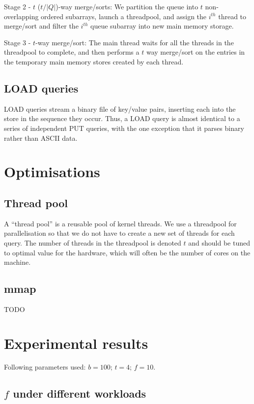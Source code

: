\documentclass{acm}
\begin{document}
Stage 2 - $t$ ($t/|Q|$)-way merge/sorts: We partition the queue into $t$ non-overlapping ordered subarrays, launch a threadpool, and assign the $i^{th}$ thread to merge/sort and filter the $i^{th}$ queue subarray into new main memory storage.

Stage 3 - $t$-way merge/sort: The main thread waits for all the threads in the threadpool to complete, and then performs a $t$ way merge/sort on the entries in the temporary main memory stores created by each thread.

\subsection{LOAD queries}

LOAD queries stream a binary file of key/value pairs, inserting each into the store in the sequence they occur. Thus, a LOAD query is almost identical to a series of independent PUT queries, with the one exception that it parses binary rather than ASCII data.

\section{Optimisations}

\subsection{Thread pool}

A ``thread pool'' is a reusable pool of kernel threads. We use a threadpool for parallelisation so that we do not have to create a new set of threads for each query. The number of threads in the threadpool is denoted $t$ and should be tuned to optimal value for the hardware, which will often be the number of cores on the machine.

\subsection{mmap}

TODO

\section{Experimental results}

Following parameters used: $b = 100$; $t = 4$; $f = 10$.

\subsection{$f$ under different workloads}
\end{document}
